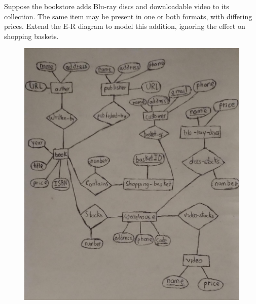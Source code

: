\documentclass[letterpaper, 12pt]{report}
\begin{document}
Suppose the bookstore adds Blu-ray discs and downloadable video to its
collection. The same item may be present in one or both formats, with
differing prices. Extend the E-R diagram to model this addition, ignoring
the effect on shopping baskets.

\begin{figure}[H]
	\begin{center}
		\includegraphics[width=\linewidth]{./Images/Punto_5b.jpeg}
	\end{center}
\end{figure}

\printbibliography
\end{document}
